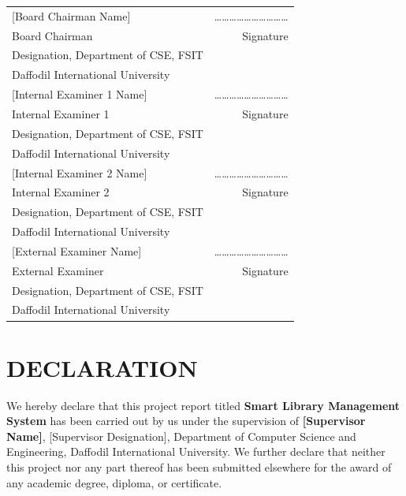 \vspace{0.8cm}
\begin{table}[H]
\centering
\begin{tabular}{p{8.5cm}r}
{[Board Chairman Name]} & \dots\dots\dots\dots\dots\dots\dots\dots\dots\dots \\
Board Chairman & Signature \\
Designation, Department of CSE, FSIT & \\
Daffodil International University & \\[0.8cm]

{[Internal Examiner 1 Name]} & \dots\dots\dots\dots\dots\dots\dots\dots\dots\dots \\
Internal Examiner 1 & Signature \\
Designation, Department of CSE, FSIT & \\
Daffodil International University & \\[0.8cm]

{[Internal Examiner 2 Name]} & \dots\dots\dots\dots\dots\dots\dots\dots\dots\dots \\
Internal Examiner 2 & Signature \\
Designation, Department of CSE, FSIT & \\
Daffodil International University & \\[0.8cm]

{[External Examiner Name]} & \dots\dots\dots\dots\dots\dots\dots\dots\dots\dots \\
External Examiner & Signature \\
Designation, Department of CSE, FSIT & \\
Daffodil International University & \\
\end{tabular}
\end{table}

\cleardoublepage
\section*{DECLARATION}

We hereby declare that this project report titled \textbf{Smart Library Management System} has been carried out by us under the supervision of \textbf{[Supervisor Name]}, [Supervisor Designation], Department of Computer Science and Engineering, Daffodil International University. We further declare that neither this project nor any part thereof has been submitted elsewhere for the award of any academic degree, diploma, or certificate.

